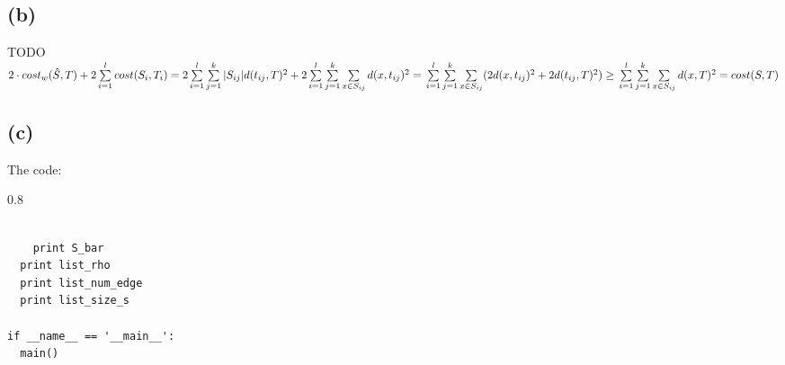 \documentclass{article}
\newenvironment{myenv}[1]
  {\begin{spacing}{#1}}
  {\end{spacing}}
\begin{document}
\subsection{(b)}
TODO \\
$2\cdot cost_w(\hat S,T) + 2\sum\limits_{i=1}^{l}cost(S_i, T_i) = \\
2 \sum\limits_{i=1}^{l}\sum\limits_{j=1}^{k}|S_{ij}|d(t_{ij}, T)^2 + 2\sum\limits_{i=1}^{l}\sum\limits_{j=1}^{k}\sum\limits_{x \in S_{ij}} d(x,t_{ij})^2 = \\
\sum\limits_{i=1}^{l}\sum\limits_{j=1}^{k}\sum\limits_{x \in S_{ij}} (2d(x,t_{ij})^2 + 2d(t_{ij},T)^2) \ge \\
\sum\limits_{i=1}^{l}\sum\limits_{j=1}^{k}\sum\limits_{x \in S_{ij}}d(x,T)^2 =\\
cost(S,T)$

\subsection{(c)}

The code:

\begin{myenv}{0.8}
\begin{verbatim}

    print S_bar
  print list_rho
  print list_num_edge
  print list_size_s

if __name__ == '__main__':
  main()
\end{verbatim}
\end{myenv}
\end{document}
